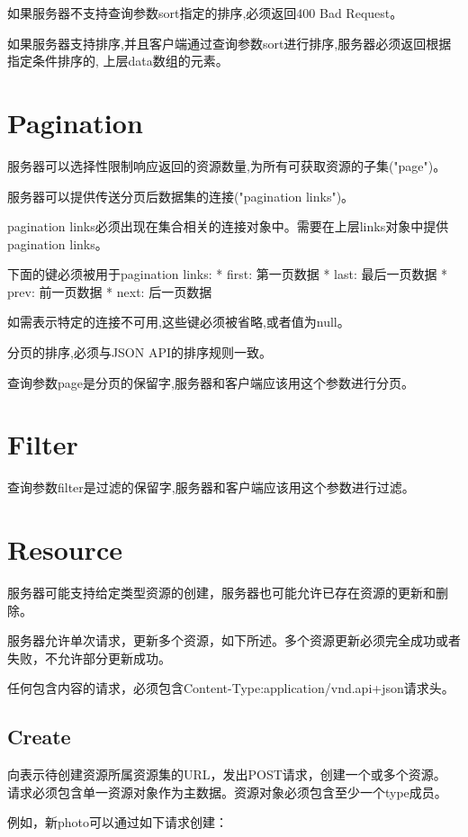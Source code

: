 如果服务器不支持查询参数sort指定的排序,必须返回400 Bad Request。

如果服务器支持排序,并且客户端通过查询参数sort进行排序,服务器必须返回根据指定条件排序的, 上层data数组的元素。


\section{Pagination}

服务器可以选择性限制响应返回的资源数量,为所有可获取资源的子集("page")。

服务器可以提供传送分页后数据集的连接("pagination links")。

pagination links必须出现在集合相关的连接对象中。需要在上层links对象中提供pagination links。

下面的键必须被用于pagination links: * first: 第一页数据 * last: 最后一页数据 * prev: 前一页数据 * next: 后一页数据

如需表示特定的连接不可用,这些键必须被省略,或者值为null。

分页的排序,必须与JSON API的排序规则一致。

查询参数page是分页的保留字,服务器和客户端应该用这个参数进行分页。

\section{Filter}

查询参数filter是过滤的保留字,服务器和客户端应该用这个参数进行过滤。

\section{Resource}


服务器可能支持给定类型资源的创建，服务器也可能允许已存在资源的更新和删除。

服务器允许单次请求，更新多个资源，如下所述。多个资源更新必须完全成功或者失败，不允许部分更新成功。

任何包含内容的请求，必须包含Content-Type:application/vnd.api+json请求头。

\subsection{Create}

向表示待创建资源所属资源集的URL，发出POST请求，创建一个或多个资源。 请求必须包含单一资源对象作为主数据。资源对象必须包含至少一个type成员。

例如，新photo可以通过如下请求创建：

